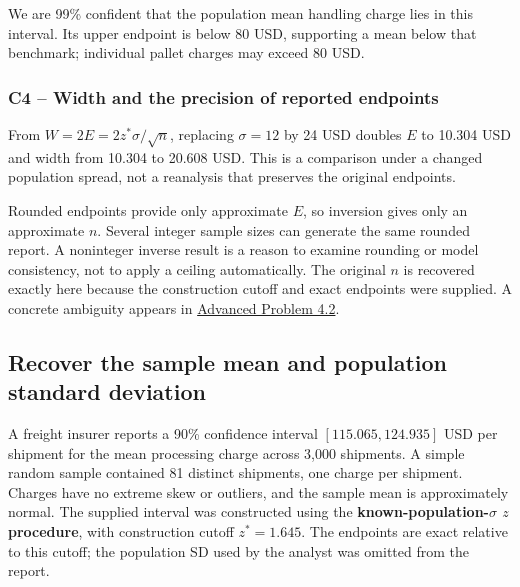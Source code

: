 We are 99\% confident that the population mean handling charge lies in this interval. Its upper endpoint is below 80 USD, supporting a mean below that benchmark; individual pallet charges may exceed 80 USD.

\subsubsection*{C4 -- Width and the precision of reported endpoints}\label{sol:c4-2-b}
From $W=2E=2z^*\sigma/\sqrt n$, replacing $\sigma=12$ by 24 USD doubles $E$ to 10.304 USD and width from 10.304 to 20.608 USD. This is a comparison under a changed population spread, not a reanalysis that preserves the original endpoints.

Rounded endpoints provide only approximate $E$, so inversion gives only an approximate $n$. Several integer sample sizes can generate the same rounded report. A noninteger inverse result is a reason to examine rounding or model consistency, not to apply a ceiling automatically. The original $n$ is recovered exactly here because the construction cutoff and exact endpoints were supplied. A concrete ambiguity appears in \hyperref[prob:c4-advanced-2]{Advanced Problem 4.2}.

\subsection{Recover the sample mean and population standard deviation}\label{prob:c4-3}
A freight insurer reports a 90\% confidence interval $[115.065,124.935]$ USD per shipment for the mean processing charge across 3,000 shipments. A simple random sample contained 81 distinct shipments, one charge per shipment. Charges have no extreme skew or outliers, and the sample mean is approximately normal. The supplied interval was constructed using the \textbf{known-population-$\sigma$ $z$ procedure}, with construction cutoff $z^*=1.645$. The endpoints are exact relative to this cutoff; the population SD used by the analyst was omitted from the report.
